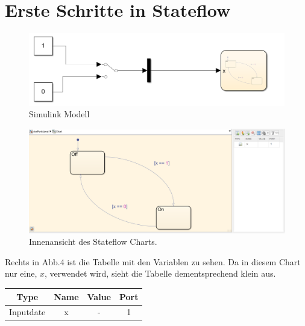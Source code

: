 \documentclass{article}
\begin{document}
	\section{Erste Schritte in Stateflow}
		\begin{figure}[h]
			\centering
			\includegraphics[scale=0.7]{Aufgabe4.2.png}
			\caption{Simulink Modell}
			\label{fig_3: Aufg_2_Simulink}
		\end{figure}
		\begin{figure}[h]
			\centering
			\includegraphics[scale=0.55]{Aufgabe4.2Chart.png}
			\caption{Innenansicht des Stateflow Charts.}
			\label{fig_4: ufg_2_Chart}
		\end{figure}
		Rechts in Abb.4 ist die Tabelle mit den Variablen zu sehen. Da in diesem Chart nur eine, $x$, verwendet wird, sieht die Tabelle dementsprechend klein aus. \\
		\begin{center}
			\begin{tabular}{| c | c | c | c |}
				\hline
				Type & Name & Value & Port\\
				\hline \hline
				Inputdate & x & - & 1\\
				\hline
			\end{tabular}
		\end{center}	
\clearpage
\newpage
\end{document}
